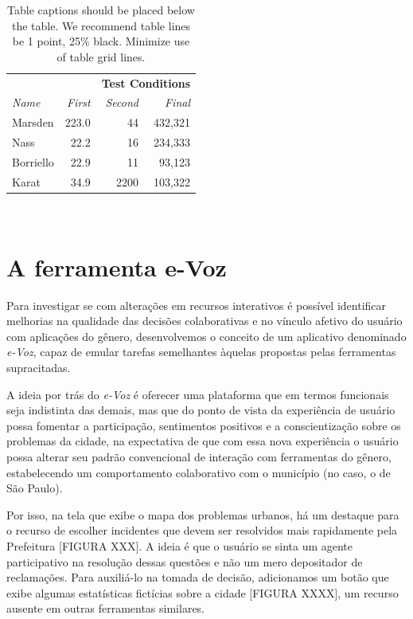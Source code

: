 \documentclass{sigchi}
\begin{document}
\begin{table}
  \centering
  \begin{tabular}{l r r r}
    & & \multicolumn{2}{c}{\small{\textbf{Test Conditions}}} \\
    \cmidrule(r){3-4}
    {\small\textit{Name}}
    & {\small \textit{First}}
      & {\small \textit{Second}}
    & {\small \textit{Final}} \\
    \midrule
    Marsden & 223.0 & 44 & 432,321 \\
    Nass & 22.2 & 16 & 234,333 \\
    Borriello & 22.9 & 11 & 93,123 \\
    Karat & 34.9 & 2200 & 103,322 \\
  \end{tabular}
  \caption{Table captions should be placed below the table. We
    recommend table lines be 1 point, 25\% black. Minimize use of
    table grid lines.}~\label{tab:table1}
\end{table}


\section{A ferramenta e-Voz}
Para investigar se com alterações em recursos interativos é possível identificar melhorias na qualidade das decisões colaborativas e no vínculo afetivo do usuário com aplicações do gênero, desenvolvemos o conceito de um aplicativo denominado \textit{e-Voz}, capaz de emular tarefas semelhantes àquelas propostas pelas ferramentas supracitadas.

A ideia por trás do \textit{e-Voz} é oferecer uma plataforma que em termos funcionais seja indistinta das demais, mas que do ponto de vista da experiência de usuário possa fomentar a participação, sentimentos positivos e a conscientização sobre os problemas da cidade, na expectativa de que com essa nova experiência o usuário possa alterar seu padrão convencional de interação com ferramentas do gênero, estabelecendo um comportamento colaborativo com o município (no caso, o de São Paulo).

Por isso, na tela que exibe o mapa dos problemas urbanos, há um destaque para o recurso de escolher incidentes que devem ser resolvidos mais rapidamente pela Prefeitura [FIGURA XXX]. A ideia é que o usuário se sinta um agente participativo na resolução dessas questões e não um mero depositador de reclamações. Para auxiliá-lo na tomada de decisão, adicionamos um botão que exibe algumas estatísticas fictícias sobre a cidade [FIGURA XXXX], um recurso ausente em outras ferramentas similares.
\end{document}
